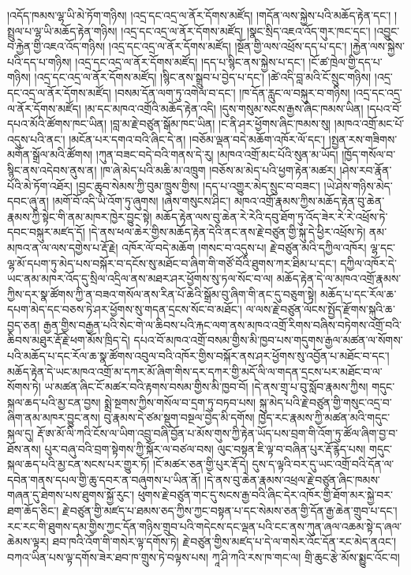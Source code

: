 \documentclass{article}
\begin{document}
།འདོད་ཁམས་ལྷ་ཡི་མེ་ཏོག་གཉིས། །འདྲ་དང་འདྲ་ལ་ནོར་དོགས་མཛོད། །གདོན་ལས་སྐྱེས་པའི་མཆོད་རྟེན་དང་། །སྤྲུལ་པ་ལྷ་ཡི་མཆོད་རྟེན་གཉིས། །འདྲ་དང་འདྲ་ལ་ནོར་དོགས་མཛོད། །སྣང་སྲིད་འཇའ་འོད་གུར་ཁང་དང་། །འབྱུང་བ་རྐྱེན་གྱི་འཇའ་འོད་གཉིས། །འདྲ་དང་འདྲ་ལ་ནོར་དོགས་མཛོད། །སྔོན་གྱི་ལས་འཕྲོས་དད་པ་དང་། །རྐྱེན་ལས་སྐྱེས་པའི་དད་པ་གཉིས། །འདྲ་དང་འདྲ་ལ་ནོར་དོགས་མཛོད། །དད་པ་སྙིང་ནས་སྐྱེས་པ་དང་། །ངོ་ཚ་ཁྲེལ་གྱི་དད་པ་གཉིས། །འདྲ་དང་འདྲ་ལ་ནོར་དོགས་མཛོད། །སྙིང་ནས་སྒྲུབ་པ་བྱེད་པ་དང་། །ཚེ་འདི་བླ་མའི་ངོ་སྲུང་གཉིས། །འདྲ་དང་འདྲ་ལ་ནོར་དོགས་མཛོད། །བསམ་དོན་ལག་ཏུ་འགེལ་བ་དང་། །ཁ་དོན་རླུང་ལ་བསྐུར་བ་གཉིས། །འདྲ་དང་འདྲ་ལ་ནོར་དོགས་མཛོད། །མ་དང་མཁའ་འགྲོའི་མཆོད་རྟེན་འདི། །དུས་གསུམ་སངས་རྒྱས་ཞིང་ཁམས་ཡིན། །དཔའ་བོ་དཔའ་མོའི་ཚོགས་ཁང་ཡིན། །བླ་མ་རྗེ་བཙུན་སྒོམ་ཁང་ཡིན། །ང་ནི་ཤར་ཕྱོགས་ཞིང་ཁམས་སུ། །མཁའ་འགྲོ་མང་པོ་འདུས་པའི་ནང་། །མངོན་པར་དགའ་བའི་ཞིང་དེ་ན། །བཅོམ་ལྡན་བདེ་མཆོག་འཁོར་ལོ་དང་། །སྤྱན་རས་གཟིགས་མགོན་སྒྲོལ་མའི་ཚོགས། །ཀུན་བཟང་བདེ་བའི་གནས་དེ་རུ། །མཁའ་འགྲོ་མང་པོའི་སུན་མ་ཡོད། །ཁྱོད་གསོལ་བ་སྙིང་ནས་འདེབས་ནུས་ན། །ཁ་ཞེ་མེད་པའི་མཆི་མ་འཁྲུག །བཅོས་མ་མེད་པའི་ཕྱག་རྟེན་མཚར། །ཤེས་རབ་རྣོན་པོའི་མེ་ཏོག་འཐོར། །བྱང་ཆུབ་སེམས་ཀྱི་བུམ་ཁྲུས་གྱིས། །དད་པ་འགྱུར་མེད་སྲུང་བ་བཟང་། །ཡེ་ཤེས་གཉིས་མེད་དབང་ཞུ་ན། །མགོ་བོ་འདི་ཡི་འོག་ཏུ་ཞུགས། །ཞེས་གསུངས་ཤིང་། མཁའ་འགྲོ་རྣམས་ཀྱིས་མཆོད་རྟེན་བུ་ཆེན་རྣམས་ཀྱི་སྟེང་གི་ནམ་མཁར་ཁྱེར་བྱུང་སྟེ། མཆོད་རྟེན་ལས་བུ་ཆེན་རེ་རེའི་དབུ་ཐོག་ཏུ་འོད་ཟེར་རེ་རེ་འཕྲོས་ཏེ་དབང་བསྐུར་མཛད་དོ། །དེ་ནས་ཕལ་ཆེར་གྱིས་མཆོད་རྟེན་དེའི་ནང་ནས་རྗེ་བཙུན་གྱི་སྐུ་དེ་ཕྱིར་འཕྲོས་ཏེ། ནམ་མཁའ་ན་ལ་ལས་དགྱེས་པ་རྡོ་རྗེ། འཁོར་ལོ་བདེ་མཆོག །གསང་བ་འདུས་པ། རྗེ་བཙུན་མའི་དཀྱིལ་འཁོར། ལྷ་དང་ལྷ་མོ་དཔག་ཏུ་མེད་པས་བསྐོར་བ་དངོས་སུ་མཐོང་བ་ཞིག་གི་གཙོ་བོའི་ཐུགས་ཀར་ཐིམ་པ་དང་། དཀྱིལ་འཁོར་དེ་ཡང་ནམ་མཁར་འོད་དུ་སྲིལ་འདྲིལ་ནས་མཐར་ཤར་ཕྱོགས་སུ་ཏལ་སོང་བ་ལ། མཆོད་རྟེན་དེ་ལ་མཁའ་འགྲོ་རྣམས་ཀྱིས་དར་སྣ་ཚོགས་ཀྱི་ན་བཟའ་གསོལ་ནས་རིན་པོ་ཆེའི་སྒྲོམ་བུ་ཞིག་གི་ནང་དུ་བཅུག་སྟེ། མཆོད་པ་དང་རོལ་ཆ་དཔག་མེད་དང་བཅས་ཏེ་ཤར་ཕྱོགས་སུ་གདན་དྲངས་སོང་བ་མཐོང་། ལ་ལས་རྗེ་བཙུན་ལོངས་སྤྱོད་རྫོགས་སྐུའི་ཆ་བྱད་ཅན། རྒྱན་གྱིས་བརྒྱན་པའི་སེང་གེ་ལ་ཆིབས་པའི་རྐང་ལག་ནས་མཁའ་འགྲོ་རིགས་བཞིས་བཏེགས་འགྲོ་བའི་ཆིབས་མཐུར་རྡོ་རྗེ་ཕག་མོས་ཁྲིད་དེ། དཔའ་བོ་མཁའ་འགྲོ་བསམ་གྱིས་མི་ཁྱབ་པས་གདུགས་རྒྱལ་མཚན་ལ་སོགས་པའི་མཆོད་པ་དང་རོལ་ཆ་སྣ་ཚོགས་འབུལ་བའི་འཁོར་གྱིས་བསྐོར་ནས་ཤར་ཕྱོགས་སུ་འབྱོན་པ་མཐོང་བ་དང་། མཆོད་རྟེན་དེ་ཡང་མཁའ་འགྲོ་མ་དཀར་མོ་ཞིག་གིས་དར་དཀར་གྱི་མདོ་ལི་ལ་གདན་དྲངས་པར་མཐོང་བ་ལ་སོགས་ཏེ། ཡ་མཚན་ཞིང་ངོ་མཚར་བའི་རྟགས་བསམ་གྱིས་མི་ཁྱབ་བོ། །དེ་ནས་གྲྭ་པ་བུ་སློབ་རྣམས་ཀྱིས། གདུང་སྐལ་ཆད་པའི་མྱ་ངན་བྱས། སྨྲེ་སྔགས་ཀྱིས་གསོལ་བ་དྲག་ཏུ་བཏབ་པས། སྐུ་མེད་པའི་རྗེ་བཙུན་གྱི་གསུང་འདྲ་བ་ཞིག་ནམ་མཁར་བྱུང་ནས། བུ་རྣམས་དེ་ཙམ་སྡུག་བསྔལ་བྱེད་མི་དགོས། ཁྱེད་རང་རྣམས་ཀྱི་མཚན་མའི་གདུང་སྐལ་དུ། རྡོ་ཨ་མོ་ལི་ཀའི་ངོས་ལ་ཡིག་འབྲུ་བཞི་བྱོན་པ་མོས་གུས་ཀྱི་རྟེན་ཡོད་པས་བྲག་གི་འོག་ཏུ་ཚོལ་ཞིག་བྱ་བ་ཐོས་ནས། པུར་བཞུ་བའི་བྲག་སྟེགས་ཀྱི་སྐོར་ལ་བཙལ་བས། ལུང་བསྟན་ཇི་ལྟ་བ་བཞིན་པུར་རྡོ་རྙེད་པས། གདུང་སྐལ་ཆད་པའི་མྱ་ངན་སངས་པར་གྱུར་ཏོ། །ངོ་མཚར་ཅན་གྱི་པུར་རྡོ་དེ། དུས་ད་ལྟའི་བར་དུ་ཡང་འགྲོ་བའི་དོན་ལ་དབེན་གནས་དཔལ་གྱི་ཆུ་དབར་ན་བཞུགས་པ་ཡིན་ནོ། །དེ་ནས་བུ་ཆེན་རྣམས་འཕྲལ་རྗེ་བཙུན་ཞིང་ཁམས་གཞན་དུ་ཐེགས་པས་ཐུགས་སྐྱོ་རུང་། ཕུགས་རྗེ་བཙུན་གང་དུ་སངས་རྒྱ་བའི་ཞིང་དེར་འཁོར་གྱི་ཐོག་མར་སྐྱེ་བར་ཐག་ཆོད་ཅིང་། རྗེ་བཙུན་གྱི་མཛད་པ་ཐམས་ཅད་ཀྱིས་ཀྱང་བསྟན་པ་དང་སེམས་ཅན་གྱི་དོན་རྒྱ་ཆེན་གྲུབ་པ་དང་། རང་རང་གི་ཐུགས་དམ་གྱིས་ཀྱང་དོན་གཉིས་གྲུབ་པའི་གདེངས་དང་ལྡན་པའི་ངང་ནས་ཀུན་ཞལ་འཆམ་སྟེ་ད་ཞལ་ཆེམས་ལྟར། ཐབ་ཁའི་འོག་གི་གསེར་ལྟ་དགོས་ཏེ། རྗེ་བཙུན་གྱིས་མཛད་པ་དེ་ལ་གསེར་འོང་དོན་རང་མེད་ནའང་། བཀའ་ཡིན་པས་ལྟ་དགོས་ཟེར་ཐབ་ཁ་གྲུས་ཏེ་བལྟས་པས། ཀཱ་ཤི་ཀའི་རས་ཁ་གང་ལ། གྲི་ཆུང་རྩེ་མོས་སྨྱུང་འོང་བ། 
\end{document}
